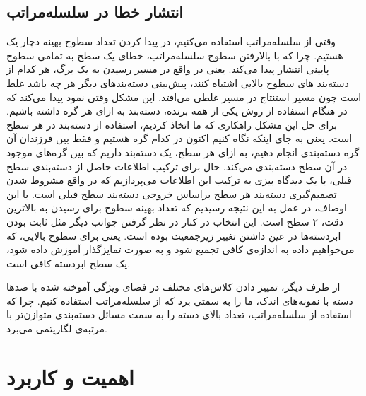 \subsection{انتشار خطا در سلسله‌مراتب}
وقتی از سلسله‌مراتب استفاده می‌‌کنیم، در پیدا کردن تعداد سطوح بهینه دچار یک 
هستیم. چرا که با بالارفتن سطوح سلسله‌مراتب، خطای یک سطح به تمامی سطوح پایینی انتشار پیدا می‌کند. یعنی در واقع در مسیر رسیدن به یک برگ، هر کدام از دسته‌بند های سطوح بالایی اشتباه کنند، پیش‌بینی دسته‌بند‌های دیگر هر چه باشد غلط است چون مسیر استنتاج در مسیر غلطی می‌افتد. این مشکل وقتی نمود پیدا می‌کند که در هنگام استفاده از روش یکی از همه برنده، دسته‌بند به ازای هر گره داشته باشیم. برای حل این مشکل راهکاری که ما اتخاذ کردیم، استفاده از دسته‌بند در هر سطح است. یعنی به جای اینکه نگاه کنیم اکنون در کدام گره هستیم و فقط بین فرزندان آن گره دسته‌بندی انجام دهیم، به ازای هر سطح، یک دسته‌بند داریم که بین گره‌های موجود در آن سطح دسته‌بندی می‌کند. حال برای ترکیب اطلاعات حاصل از دسته‌بندی سطح قبلی، با یک دیدگاه بیزی به ترکیب این اطلاعات می‌پردازیم که در واقع مشروط شدن تصمیم‌گیری دسته‌بند هر سطح براساس خروجی دسته‌بند سطح قبلی است. با این اوصاف، در عمل به این نتیجه رسیدیم که تعداد بهینه سطوح برای رسیدن به بالاترین دقت، ۲ سطح است. این انتخاب در کنار در نظر گرفتن جوانب دیگر مثل ثابت بودن ابردسته‌ها در عین داشتن تغییر زیرجمعیت بوده است. یعنی برای سطوح بالایی، که می‌خواهیم داده به اندازه‌ی کافی تجمیع شود و به صورت تمایزگذار آموزش داده شود، یک سطح ابردسته کافی است. 

از طرف دیگر، تمییز دادن کلاس‌های مختلف در فضای ویژگی آموخته شده با صدها دسته با نمونه‌های اندک، ما را به سمتی برد که از سلسله‌مراتب استفاده کنیم. چرا که استفاده از سلسله‌مراتب، تعداد بالای دسته را به سمت مسائل دسته‌بندی متوازن‌تر با مرتبه‌ی لگاریتمی می‌برد.


\section{اهمیت و کاربرد}

